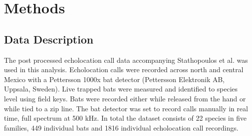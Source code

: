 \documentclass[wsdraft]{ws-rv9x6} %
\begin{document}
\section{Methods}

\subsection{Data Description}

The post processed echolocation call data accompanying Stathopoulos et al. \cite{stathopoulos2017bat} was used in this analysis. Echolocation calls were recorded across north and central Mexico with a Pettersson 1000x bat detector (Pettersson Elektronik AB, Uppsala, Sweden). Live trapped bats were measured and identified to species level using field keys.\cite{ceballos2005mamiferos} \cite{medellin2sanchez} Bats were recorded either while released from the hand or while tied to a zip line. The bat detector was set to record calls manually in real time, full spectrum at 500 kHz. 
In total the dataset consists of 22 species in five families, 449 individual bats and 1816 individual echolocation call recordings.
\end{document}
